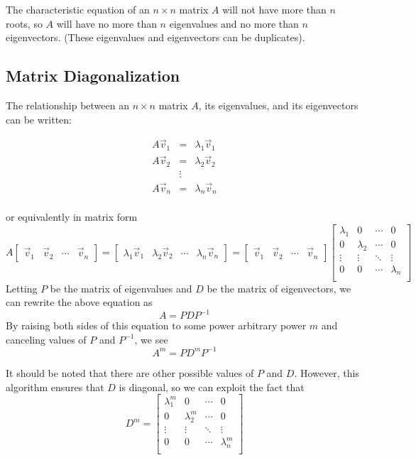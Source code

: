 The characteristic equation of an $n \times n$ matrix $A$ will not have more than $n$ roots, so $A$ will have no more than $n$ eigenvalues and no more than $n$ eigenvectors. (These eigenvalues and eigenvectors can be duplicates).

\subsection{Matrix Diagonalization}

The relationship between an $n \times n$ matrix $A$, its eigenvalues, and its eigenvectors can be written:

$$\begin{matrix}
A\vec{v}_{1}&=&\lambda_{1}\vec{v}_{1}\\
A\vec{v}_{2}&=&\lambda_{2}\vec{v}_{2}\\
& \vdots &\\
A\vec{v}_{n}&=&\lambda_{n}\vec{v}_{n}\\
\end{matrix}$$

or equivalently in matrix form
$$A
\begin{bmatrix} \vec{v}_{1} & \vec{v}_{2} & \cdots & \vec{v}_{n} \end{bmatrix}
=
\begin{bmatrix} \lambda_{1}\vec{v}_{1} & \lambda_{2}\vec{v}_{2} & \cdots & \lambda_{n}\vec{v}_{n} \end{bmatrix}
=
\begin{bmatrix} \vec{v}_{1} & \vec{v}_{2} & \cdots & \vec{v}_{n} \end{bmatrix}
\begin{bmatrix}
\lambda_{1} & 0           & \cdots & 0          \\
0           & \lambda_{2} & \cdots & 0          \\
\vdots      & \vdots      & \ddots & \vdots     \\
0           & 0           & \cdots & \lambda_{n}\\
\end{bmatrix}$$
Letting $P$ be the matrix of eigenvalues and $D$ be the matrix of eigenvectors, we can rewrite the above equation as $$A = PDP^{-1}$$
By raising both sides of this equation to some power arbitrary power $m$ and canceling values of $P$ and $P^{-1}$, we see $$A^{m} = PD^{m}P^{-1}$$

It should be noted that there are other possible values of $P$ and $D$. However, this algorithm ensures that $D$ is diagonal, so we can exploit the fact that $$D^{m} =
\begin{bmatrix}
\lambda_{1}^{m} & 0               & \cdots & 0              \\
0               & \lambda_{2}^{m} & \cdots & 0              \\
\vdots          & \vdots          & \ddots & \vdots         \\
0               & 0               & \cdots & \lambda_{n}^{m}\\
\end{bmatrix}$$

